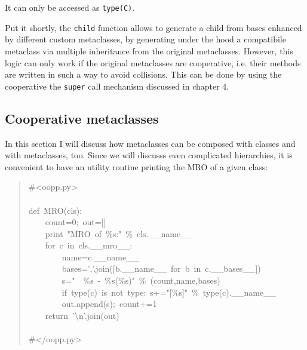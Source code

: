 \documentclass[10pt,english]{article}
\begin{document}
It can only be accessed as \texttt{type(C)}.

Put it shortly, the \texttt{child} function allows to generate a child from bases 
enhanced by different custom metaclasses, by generating under the hood a 
compatibile metaclass via multiple inheritance from the original metaclasses. 
However, this logic can only work if the original metaclasses are
cooperative, i.e. their methods are written in such a way to avoid
collisions. This can be done by using the cooperative the \texttt{super} call 
mechanism discussed in chapter 4.



\hypertarget{cooperative-metaclasses}{}
\subsection*{Cooperative metaclasses}

In this section I will discuss how metaclasses can be composed with
classes and with metaclasses, too. Since we will discusss even
complicated hierarchies, it is convenient to have an utility 
routine printing the MRO of a given class:
\begin{quote}
\begin{ttfamily}\begin{flushleft}
\mbox{{\#}<oopp.py>}\\
\mbox{}\\
\mbox{def~MRO(cls):}\\
\mbox{~~~~count=0;~out=[]}\\
\mbox{~~~~print~"MRO~of~{\%}s:"~{\%}~cls.{\_}{\_}name{\_}{\_}}\\
\mbox{~~~~for~c~in~cls.{\_}{\_}mro{\_}{\_}:}\\
\mbox{~~~~~~~~name=c.{\_}{\_}name{\_}{\_}}\\
\mbox{~~~~~~~~bases=','.join([b.{\_}{\_}name{\_}{\_}~for~b~in~c.{\_}{\_}bases{\_}{\_}])}\\
\mbox{~~~~~~~~s="~~{\%}s~-~{\%}s({\%}s)"~{\%}~(count,name,bases)}\\
\mbox{~~~~~~~~if~type(c)~is~not~type:~s+="[{\%}s]"~{\%}~type(c).{\_}{\_}name{\_}{\_}}\\
\mbox{~~~~~~~~out.append(s);~count+=1}\\
\mbox{~~~~return~'{\textbackslash}n'.join(out)}\\
\mbox{}\\
\mbox{{\#}</oopp.py>}
\end{flushleft}\end{ttfamily}
\end{quote}
\end{document}
